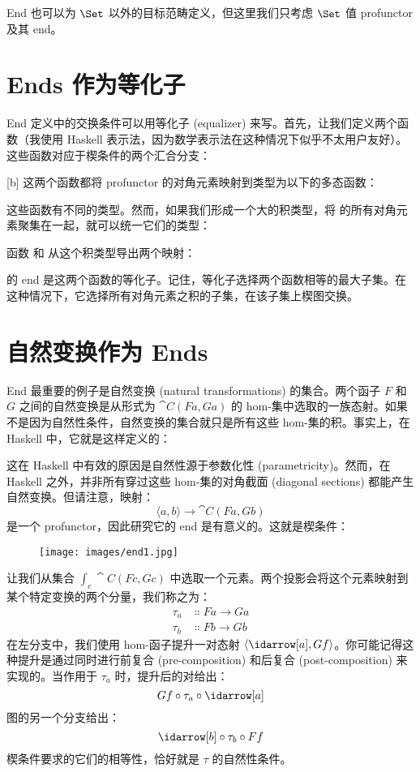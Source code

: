 End 也可以为 $\Set$ 以外的目标范畴定义，但这里我们只考虑 $\Set$ 值 profunctor 及其 end。

\section{Ends 作为等化子}

End 定义中的交换条件可以用等化子 (equalizer) 来写。首先，让我们定义两个函数（我使用 Haskell 表示法，因为数学表示法在这种情况下似乎不太用户友好）。这些函数对应于楔条件的两个汇合分支：

[b]
这两个函数都将 profunctor  的对角元素映射到类型为以下的多态函数：

这些函数有不同的类型。然而，如果我们形成一个大的积类型，将  的所有对角元素聚集在一起，就可以统一它们的类型：

函数  和  从这个积类型导出两个映射：

 的 end 是这两个函数的等化子。记住，等化子选择两个函数相等的最大子集。在这种情况下，它选择所有对角元素之积的子集，在该子集上楔图交换。

\section{自然变换作为 Ends}

End 最重要的例子是自然变换 (natural transformations) 的集合。两个函子 $F$ 和 $G$ 之间的自然变换是从形式为 $\cat{C}(F a, G a)$ 的 hom-集中选取的一族态射。如果不是因为自然性条件，自然变换的集合就只是所有这些 hom-集的积。事实上，在 Haskell 中，它就是这样定义的：

这在 Haskell 中有效的原因是自然性源于参数化性 (parametricity)。然而，在 Haskell 之外，并非所有穿过这些 hom-集的对角截面 (diagonal sections) 都能产生自然变换。但请注意，映射：
\[\langle a, b \rangle \to \cat{C}(F a, G b)\]
是一个 profunctor，因此研究它的 end 是有意义的。这就是楔条件：

\begin{figure}[H]
  \centering
  \texttt{[image: images/end1.jpg]}
\end{figure}

\noindent
让我们从集合 $\int_c \cat{C}(F c, G c)$ 中选取一个元素。两个投影会将这个元素映射到某个特定变换的两个分量，我们称之为：
\begin{align*}
  \tau_a & \Colon F a \to G a \\
  \tau_b & \Colon F b \to G b
\end{align*}
在左分支中，我们使用 hom-函子提升一对态射 $\langle \idarrow[a], G f \rangle$。你可能记得这种提升是通过同时进行前复合 (pre-composition) 和后复合 (post-composition) 来实现的。当作用于 $\tau_a$ 时，提升后的对给出：
\[G f \circ \tau_a \circ \idarrow[a]\]
图的另一个分支给出：
\[\idarrow[b] \circ \tau_b \circ F f\]
楔条件要求的它们的相等性，恰好就是 $\tau$ 的自然性条件。

